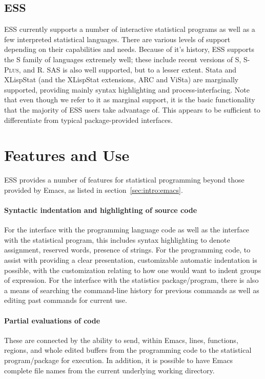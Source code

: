 \documentclass{article}
\newcommand*{\Splus}{\textsc{S-Plus}}
\begin{document}
\subsection{ESS}
\label{sec:UI:ESS}

ESS currently supports a number of interactive statistical programs as
well as a few interpreted statistical languages. There are various
levels of support depending on their capabilities and needs.  Because
of it's history, ESS supports the S family of languages extremely
well; these include recent versions of S, \Splus, and R.  SAS is also
well supported, but to a lesser extent.  Stata and XLispStat (and the
XLispStat extensions, ARC and ViSta) are marginally supported,
providing mainly syntax highlighting and process-interfacing.  Note
that even though we refer to it as marginal support, it is the basic
functionality that the majority of ESS users take advantage of.  This
appears to be sufficient to differentiate from typical
package-provided interfaces.

\section{Features and Use}
\label{sec:basic}

ESS provides a number of features for statistical programming beyond
those provided by Emacs, as listed in section~\ref{sec:intro:emacs}.

\paragraph{Syntactic indentation and highlighting of source code}
For the interface with the programming language code as well as the
interface with the statistical program, this includes syntax
highlighting to denote assignment, reserved words, presence of
strings.  For the programming code, to assist with providing a clear
presentation, customizable automatic indentation is possible, with the
customization relating to how one would want to indent groups of
expression.  For the interface with the statistics package/program,
there is also a means of searching the command-line history for
previous commands as well as editing past commands for current use.

\paragraph{Partial evaluations of code}
These are connected by the ability to send, within Emacs, lines,
functions, regions, and whole edited buffers from the programming code
to the statistical program/package for execution.  In addition, it is
possible to have Emacs complete file names from the current underlying
working directory.
\end{document}
